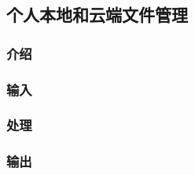 \subsection{个人本地和云端文件管理}
\subsubsection{介绍}
\subsubsection{输入}
\subsubsection{处理}
\subsubsection{输出}